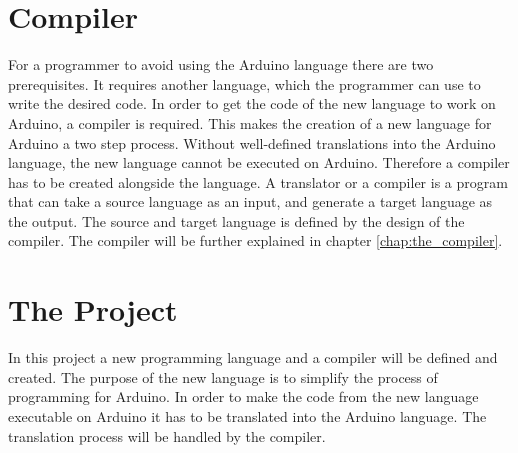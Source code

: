 \section{Compiler}
For a programmer to avoid using the Arduino language there are two prerequisites. It requires another language, which the programmer can use to write the desired code. In order to get the code of the new language to work on Arduino, a compiler is required. This makes the creation of a new language for Arduino a two step process. Without well-defined translations into the Arduino language, the new language cannot be executed on Arduino. Therefore a compiler has to be created alongside the language.
A translator or a compiler is a program that can take a source language as an input, and generate a target language as the output. The source and target language is defined by the design of the compiler. The compiler will be further explained in chapter \ref{chap:the_compiler}.

\section{The Project}
In this project a new programming language and a compiler will be defined and created. The purpose of the new language is to simplify the process of programming for Arduino. In order to make the code from the new language executable on Arduino it has to be translated into the Arduino language. The translation process will be handled by the compiler. 